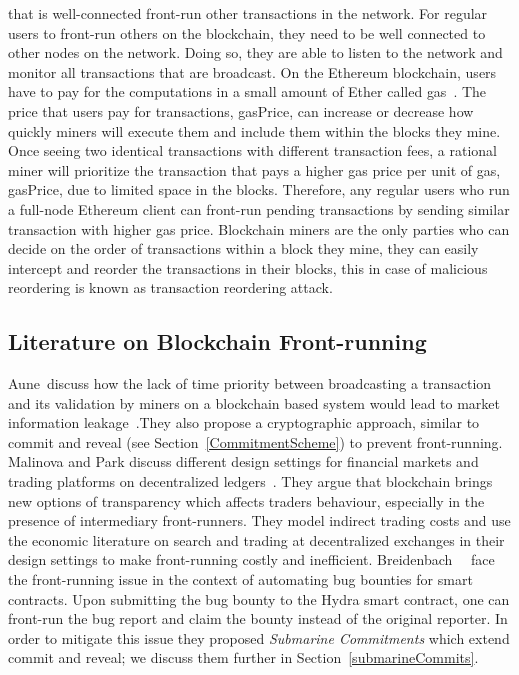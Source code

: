  that is well-connected front-run other transactions in the network. For regular users to front-run others on the blockchain, they need to be well connected to other nodes on the network. Doing so, they are able to listen to the network and monitor all transactions that are broadcast. On the Ethereum blockchain, users have to pay for the computations in a small amount of Ether called \textsf{gas}~\cite{AccountT67:online}. The price that users pay for transactions, \textsf{gasPrice}, can increase or decrease how quickly miners will execute them and include them within the blocks they mine. Once seeing two identical transactions with different transaction fees, a rational miner will prioritize the transaction that pays a higher gas price per unit of gas, \textsf{gasPrice}, due to limited space in the blocks. Therefore, any regular users who run a full-node Ethereum client can front-run pending transactions by sending similar transaction with higher gas price. Blockchain miners are the only parties who can decide on the order of transactions within a block they mine, they can easily intercept and reorder the transactions in their blocks, this in case of malicious reordering is known as \textsf{transaction reordering} attack. 

\subsection{Literature on Blockchain Front-running}

Aune~\etal discuss how the lack of time priority between broadcasting a transaction and its validation by miners on a blockchain based system would lead to market information leakage~\cite{aune2017footprints}.They also propose a cryptographic approach, similar to commit and reveal (see Section~\ref{CommitmentScheme}) to prevent front-running. Malinova and Park discuss different design settings for financial markets and trading platforms on decentralized ledgers~\cite{malinova2017market}. They argue that blockchain brings new options of transparency which affects traders behaviour, especially in the presence of intermediary front-runners. They model indirect trading costs and use the economic literature on search and trading at decentralized exchanges in their design settings to make front-running costly and inefficient. Breidenbach~\etal~\cite{breidenbach2018enter} face the front-running issue in the context of automating bug bounties for smart contracts. Upon submitting the bug bounty to the Hydra smart contract, one can front-run the bug report and claim the bounty instead of the original reporter. In order to mitigate this issue they proposed \textit{Submarine Commitments} which extend commit and reveal; we discuss them further in Section~\ref{submarineCommits}.

